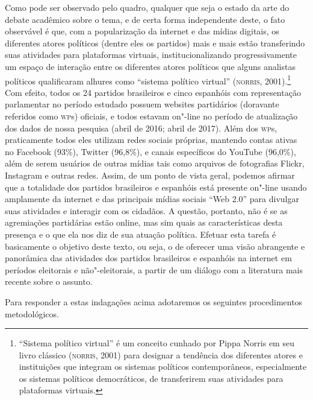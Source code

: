 
Como pode ser observado pelo quadro, qualquer que seja o estado da arte
do debate acadêmico sobre o tema, e de certa forma independente deste, o
fato observável é que, com a popularização da internet e das mídias
digitais, os diferentes atores políticos (dentre eles os partidos) mais
e mais estão transferindo suas atividades para plataformas virtuais,
institucionalizando progressivamente um espaço de interação entre os
diferentes atores políticos que alguns analistas políticos qualificaram
alhures como ``sistema político virtual'' (\textsc{norris}, 2001).\footnote{``Sistema
  político virtual'' é um conceito cunhado por Pippa Norris em seu livro
  clássico (\textsc{norris}, 2001) para designar a tendência dos diferentes
  atores e instituições que integram os sistemas políticos
  contemporâneos, especialmente os sistemas políticos democráticos, de
  transferirem suas atividades para plataformas virtuais.} Com efeito,
todos os 24 partidos brasileiros e cinco espanhóis com representação
parlamentar no período estudado possuem websites partidários (doravante
referidos como \textsc{wp}s) oficiais, e todos estavam on"-line no período de
atualização dos dados de nossa pesquisa (abril de 2016; abril de 2017).
Além dos \textsc{wp}s, praticamente todos eles utilizam redes sociais próprias,
mantendo contas ativas no Facebook (93\%), Twitter (96,8\%), e canais
específicos do YouTube (96,0\%), além de serem usuários de outras mídias
tais como arquivos de fotografias Flickr, Instagram e outras redes.
Assim, de um ponto de vista geral, podemos afirmar que a totalidade dos
partidos brasileiros e espanhóis está presente on"-line usando amplamente
da internet e das principais mídias sociais ``Web 2.0'' para divulgar
suas atividades e interagir com os cidadãos. A questão, portanto, não é
se as agremiações partidárias estão online, mas sim quais as
características desta presença e o que ela nos diz de sua atuação
política. Efetuar esta tarefa é basicamente o objetivo deste texto, ou
seja, o de oferecer uma visão abrangente e panorâmica das atividades dos
partidos brasileiros e espanhóis na internet em períodos eleitorais e
não"-eleitorais, a partir de um diálogo com a literatura mais recente
sobre o assunto.

Para responder a estas indagações acima adotaremos os seguintes
procedimentos metodológicos.

